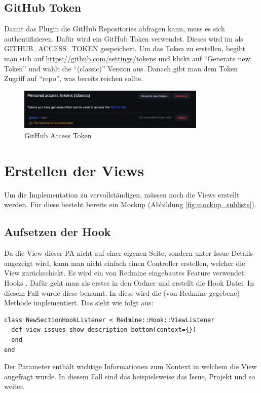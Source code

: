 \subsection{GitHub Token}
Damit das Plugin die GitHub Repositories abfragen kann, muss es sich authentifizieren. Dafür wird ein GitHub
Token verwendet. Dieses wird im  als GITHUB\_ACCESS\_TOKEN gespeichert.
\newline
Um das Token zu erstellen, begibt man sich auf \url{https://github.com/settings/tokens} und klickt auf
\enquote{Generate new Token} und wählt die \enquote{(classic)} Version aus. Danach gibt man dem Token Zugriff
auf \enquote{repo}, was bereits reichen sollte.
\begin{figure}[H]
  \centering
  \includegraphics[width=0.8\textwidth]{images/misc/github-access-token.png}
  \caption[Screenshot des GitHub Access Tokens]{GitHub Access Token}
  \label{fig:setup_github_token}
\end{figure}

\section{Erstellen der Views}
Um die Implementation zu vervollständigen, müssen noch die Views erstellt werden. Für diese besteht bereits ein
Mockup (Abbildung \ref{fig:mockup_sublists}).
\subsection{Aufsetzen der Hook}
Da die View dieser PA nicht auf einer eigenen Seite, sondern unter Issue Details angezeigt wird, kann man nicht
einfach einen Controller erstellen, welcher die View zurückschickt. Es wird ein von Redmine eingebautes Feature
verwendet: Hooks \cite{redmine_hooks}. 
\newpage
Dafür geht man als erstes in den  Ordner und erstellt die Hook Datei. In diesem Fall wurde
diese  benannt. In diese wird die (von Redmine gegebene)
 Methode implementiert. Das sieht wie folgt aus:
\begin{codebox}[]
  \begin{verbatim}
class NewSectionHookListener < Redmine::Hook::ViewListener
  def view_issues_show_description_bottom(context={})
  end
end
  \end{verbatim}
\end{codebox}
Der Parameter  enthält wichtige Informationen zum Kontext in welchem die View 
angefragt wurde. In diesem Fall sind das beispielsweise das Issue, Projekt und so weiter. \newline
